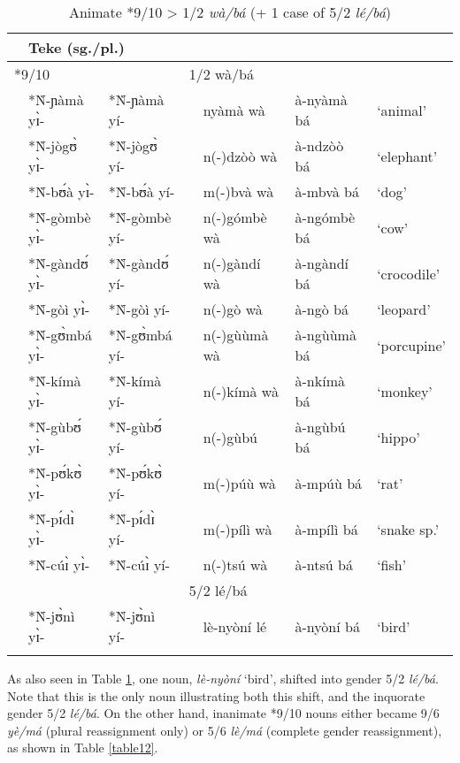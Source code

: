 \documentclass[output=paper,,modfonts,nonflat]{langsci/langscibook-Hyman-et-al}
\begin{document}
\begin{table}[!htbp]
\caption{Animate *9/10 > 1/2 \textit{wà/bá} (+ 1 case of 5/2 \textit{lé/bá})}
\label{table11}
\begin{small}
\begin{tabular}{l		l l l  		l		l		l}
\lsptoprule														
\multicolumn{3}{l}{PB (sg./pl.)}					&	\multicolumn{2}{l}{Teke (sg./pl.)}					&		\\	
\midrule														
\multicolumn{2}{l}{*9/10}			&		&	\multicolumn{2}{l}{1/2 wà/bá}			&		&		\\	
	&	*Ǹ-ɲàmà yɪ̀-	&	*Ǹ-ɲàmà yí-	&		&	nyàmà wà	&	à-nyàmà bá	&	`animal’	\\	
	&	*Ǹ-jògʊ̀ yɪ̀-	&	*Ǹ-jògʊ̀ yí-	&		&	n(-)dzòò wà	&	à-ndzòò bá	&	`elephant’	\\	
	&	*Ǹ-bʊ́à yɪ̀-	&	*Ǹ-bʊ́à yí-	&		&	m(-)bvà wà	&	à-mbvà bá	&	`dog’	\\	
	&	*Ǹ-gòmbè yɪ̀-	&	*Ǹ-gòmbè yí-	&		&	n(-)gómbè wà	&	à-ngómbè bá	&	`cow’	\\	
	&	*Ǹ-gàndʊ́ yɪ̀-	&	*Ǹ-gàndʊ́ yí-	&		&	n(-)gàndí wà	&	à-ngàndí bá	&	`crocodile’	\\	
	&	*Ǹ-gòì yɪ̀-	&	*Ǹ-gòì yí-	&		&	n(-)gò wà	&	à-ngò bá	&	`leopard’	\\	
	&	*Ǹ-gʊ̀mbá yɪ̀-	&	*Ǹ-gʊ̀mbá yí-	&		&	n(-)gùùmà wà	&	à-ngùùmà bá	&	`porcupine’	\\	
	&	*Ǹ-kímà yɪ̀-	&	*Ǹ-kímà yí-	&		&	n(-)kímà wà	&	à-nkímà bá	&	`monkey’	\\	
	&	*Ǹ-gùbʊ́ yɪ̀-	&	*Ǹ-gùbʊ́ yí-	&		&	n(-)gùbú	&	à-ngùbú bá	&	`hippo’	\\	
	&	*Ǹ-pʊ́kʊ̀ yɪ̀-	&	*Ǹ-pʊ́kʊ̀ yí-	&		&	m(-)púù wà	&	à-mpúù bá	&	`rat’	\\	
	&	*Ǹ-pɪ́dɪ̀ yɪ̀-	&	*Ǹ-pɪ́dɪ̀ yí-	&		&	m(-)pílì wà	&	à-mpílì bá	&	`snake sp.’	\\	
	&	*Ǹ-cúɪ̀ yɪ̀-	&	*Ǹ-cúɪ̀ yí-	&		&	n(-)tsú wà	&	à-ntsú bá	&	`fish’	\\	[0.2cm]
	&		&		&	\multicolumn{2}{l}{5/2 lé/bá}			&		&		\\	
	&	*Ǹ-jʊ̀nì yɪ̀-	&	*Ǹ-jʊ̀nì yí-	&		&	lè-nyòní lé	&	à-nyòní bá	&	`bird’	\\	
\lspbottomrule
\end{tabular}
\end{small}	
\end{table}

As also seen in Table \ref{table11}, one noun, \textit{lè-nyòní} `bird’, shifted into gender 5/2 \textit{lé/bá}. Note that this is the only noun illustrating both this shift, and the inquorate gender 5/2 \textit{lé/bá}. On the other hand, inanimate *9/10 nouns either became 9/6 \textit{yè/má} (plural reassignment only) or 5/6 \textit{lè/má} (complete gender reassignment), as shown in Table \ref{table12}.
\end{document}
